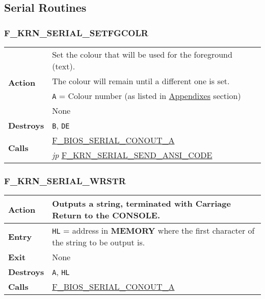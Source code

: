 \subsection{Serial Routines}

    \subsubsection{F\_KRN\_SERIAL\_SETFGCOLR}
    \label{func:fkrnserialsetfgcolr}
    \begin{tabular}{l p{9cm}}
        \hline\multirow[t]{4}{4em}{\textbf{Action}}
        & Set the colour that will be used for the foreground (text). \\
        & The colour will remain until a different one is set. \\
        \hline\textbf{Entry} & \texttt{A} = Colour number (as listed in 
        \hyperref[sec:appendixes]{Appendixes} section) \\
        \hline\textbf{Exit} & None \\
        \hline\textbf{Destroys} & \texttt{B}, \texttt{DE} \\
        \hline\multirow[t]{2}{4em}{\textbf{Calls}} 
        & \hyperref[func:fbiosserialconouta]{F\_BIOS\_SERIAL\_CONOUT\_A}\\
        & \textit{jp} \hyperref[func:fkrnserialsendansicode]{F\_KRN\_SERIAL\_SEND\_ANSI\_CODE}\\
        \hline
    \end{tabular}

    \subsubsection{F\_KRN\_SERIAL\_WRSTR}
    \label{func:fkrnserialwrstr}
    \begin{tabular}{l p{9cm}}
        \hline\multirow[t]{4}{4em}{\textbf{Action}}
        & Outputs a string, terminated with Carriage Return to the 
        \textbf{CONSOLE}.\\
        \hline\textbf{Entry} 
        & \texttt{HL} = address in \textbf{MEMORY} where the first character
        of the string to be output is.\\
        \hline\textbf{Exit} & None \\
        \hline\textbf{Destroys} & \texttt{A}, \texttt{HL} \\
        \hline\textbf{Calls}
        & \hyperref[func:fbiosserialconouta]{F\_BIOS\_SERIAL\_CONOUT\_A}\\
        \hline
    \end{tabular}

